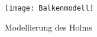 \begin{figure}

	\texttt{[image: Balkenmodell]}
	\caption{Modellierung des Holms}
	\label{fig:Holmmodellierung}
\end{figure}